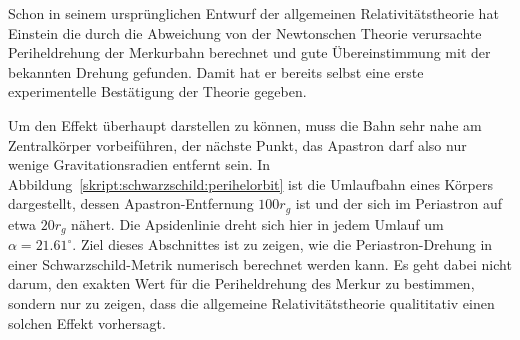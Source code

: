 Schon in seinem ursprünglichen Entwurf der allgemeinen Relativitätstheorie
hat Einstein die durch die Abweichung von der Newtonschen Theorie
verursachte Periheldrehung der Merkurbahn berechnet und gute Übereinstimmung
mit der bekannten Drehung gefunden.
Damit hat er bereits selbst eine erste experimentelle Bestätigung
der Theorie gegeben.

Um den Effekt überhaupt darstellen zu können, muss die Bahn sehr nahe
am Zentralkörper vorbeiführen, der nächste Punkt, das Apastron darf
also nur wenige Gravitationsradien entfernt sein.
In Abbildung~\ref{skript:schwarzschild:perihelorbit} ist die
Umlaufbahn eines Körpers dargestellt, dessen Apastron-Entfernung
$100 r_g$ ist und der sich im Periastron auf etwa $20r_g$ 
nähert.
Die Apsidenlinie dreht sich hier in jedem Umlauf um $\alpha = 21.61^\circ$.
Ziel dieses Abschnittes ist zu zeigen, wie die Periastron-Drehung
in einer Schwarzschild-Metrik numerisch berechnet werden kann.
Es geht dabei nicht darum, den exakten Wert für die Periheldrehung
des Merkur zu bestimmen,
sondern nur zu zeigen, dass die allgemeine Relativitätstheorie
qualititativ einen solchen Effekt vorhersagt.

